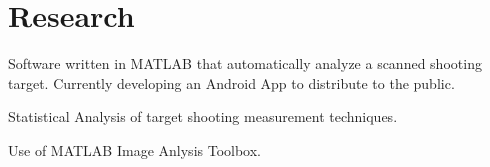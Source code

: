 \documentclass[letterpaper]{deedy-resume} %
\begin{document}







\hfill
%
%



\section{Research}

\vspace{\topsep}

\descript{}

\vspace{\topsep}
 Software written in MATLAB that automatically analyze a  scanned shooting target. Currently developing an Android App to distribute to the public.
\vspace{\topsep}
 \begin{tightitemize}
    \item Statistical Analysis of target shooting measurement techniques.
    \item Use of MATLAB Image Anlysis Toolbox. 
  \end{tightitemize}
\end{document}
